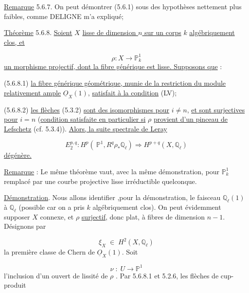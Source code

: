 \underline{Remarque} 5.6.7. On peut démontrer (5.6.1) sous des hypothèses nettement plus faibles, comme DELIGNE m'a expliqué;

\underline{Théorème} 5.6.8. \underline{Soient} $X$ \underline{lisse de dimension $n$ sur un corps} $k$ \underline{algébriquement clos, et}

\begin{equation*}
\rho : X \longrightarrow \mathbb{P}^1_k
\end{equation*}
\underline{un morphisme projectif, dont la fibre générique est lisse. Supposons que} :

(5.6.8.1) \underline{la fibre générique géométrique, munie de la restriction du module relativement ample} $\underline{O}_X(1)$, \underline{satisfait à la condition} (LV);

(5.6.8.2) \underline{les flèches} (5.3.2) \underline{sont des isomorphismes pour} $i \neq n$, \underline{et sont surjectives pour} $i = n$ (\underline{condition satisfaite en particulier si} $\rho$ \underline{provient d'un pinceau de Lefschetz} (cf. 5.3.4)). \underline{Alors, la suite spectrale de Leray}

\begin{equation*}
E_2^{p,q} : H^p(\ \mathbb{P}^1,R^q\rho_*\mathbb{Q}_{\ell}) \Longrightarrow H^{p+q}(X,\mathbb{Q}_{\ell})
\end{equation*}
\underline{dégénère.}

\underline{Remarque} : Le même théorème vaut, avec la même démonstration, pour $\mathbb{P}^1_k$ remplacé par une courbe projective lisse irréductible quelconque.



\underline{Démonstration}. Nous allons identifier ,pour la démonstration, le faisceau $\mathbb{Q}_\ell(1)$ à $\mathbb{Q}_\ell$ (possible car on a pris $k$ algébriquement clos). On peut évidemment supposer $X$ connexe, et $\rho$ \underline{surjectif}, donc plat, à fibres de dimension $n-1$. Désignons par

\begin{equation*}
\xi_X \; \in \; H^2(X,\mathbb{Q}_\ell)
\end{equation*}
la première classe de Chern de $\underline{O}_X(1)$. Soit

\begin{equation*}
\nu \; : \; U \longrightarrow \mathbb{P}^1
\end{equation*}
l'inclusion d'un ouvert de lissité de $\rho$ . Par 5.6.8.1 et 5.2.6, les flèches de cup-produit

